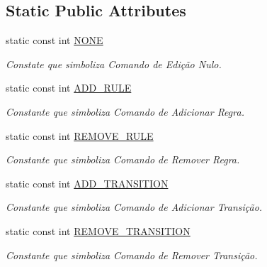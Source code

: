 \subsection*{Static Public Attributes}
\begin{DoxyCompactItemize}
\item 
static const int \hyperlink{classbr_1_1ufscar_1_1lince_1_1ginga_1_1wac_1_1editing_1_1EditingCommand_a9d41755f098b545424948a5b70dee7e2}{NONE}
\begin{DoxyCompactList}\small\item\em Constate que simboliza Comando de Edição Nulo. \item\end{DoxyCompactList}\item 
static const int \hyperlink{classbr_1_1ufscar_1_1lince_1_1ginga_1_1wac_1_1editing_1_1EditingCommand_a02c282a78048b97f4999a74b5914c4a4}{ADD\_\-RULE}
\begin{DoxyCompactList}\small\item\em Constante que simboliza Comando de Adicionar Regra. \item\end{DoxyCompactList}\item 
static const int \hyperlink{classbr_1_1ufscar_1_1lince_1_1ginga_1_1wac_1_1editing_1_1EditingCommand_a5dd0dac095cf928d23d71450807949d8}{REMOVE\_\-RULE}
\begin{DoxyCompactList}\small\item\em Constante que simboliza Comando de Remover Regra. \item\end{DoxyCompactList}\item 
static const int \hyperlink{classbr_1_1ufscar_1_1lince_1_1ginga_1_1wac_1_1editing_1_1EditingCommand_ad768e449f54846893a10f6faa233bc8b}{ADD\_\-TRANSITION}
\begin{DoxyCompactList}\small\item\em Constante que simboliza Comando de Adicionar Transição. \item\end{DoxyCompactList}\item 
static const int \hyperlink{classbr_1_1ufscar_1_1lince_1_1ginga_1_1wac_1_1editing_1_1EditingCommand_ae2166c10bacb1c75540a99e5f23e1c6f}{REMOVE\_\-TRANSITION}
\begin{DoxyCompactList}\small\item\em Constante que simboliza Comando de Remover Transição. \item\end{DoxyCompactList}\item 

\end{DoxyCompactItemize}

